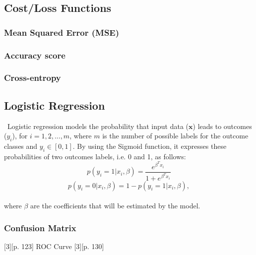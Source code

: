 \subsection{Cost/Loss Functions}
\label{chap:Cost/Loss Functions}

\subsubsection{Mean Squared Error (MSE)}
\label{chap:Mean Squared Error}

\subsubsection{Accuracy score}
\label{chap:Accuracy score}

\subsubsection{Cross-entropy}
\label{chap:Cross-entropy}

\subsection{Logistic Regression}
\label{chap:Logistic Regression}

\qquad \, Logistic regression models the probability that input data ($\textbf{x}$) leads to outcomes ($y_i$), for $i=1, 2, ..., m$, where $m$ is the number of possible labels for the outcome classes and $y_i \in [0, 1]$. By using the Sigmoid function, it expresses these probabilities of two outcomes labels, i.e. 0 and 1, as follows:\\

$$p(y_i=1|x_i, \beta) = \frac{e^{\beta^T x_i}}{1+e^{\beta^T x_i}}$$
$$p(y_i=0|x_i, \beta) = 1 - p(y_i = 1|x_i, \beta),$$\\

\noindent where $\beta$ are the coefficients that will be estimated by the model.

\subsubsection{Confusion Matrix}
\label{chap:Confusion Matrix}
[3][p. 123]
ROC Curve [3][p. 130]
